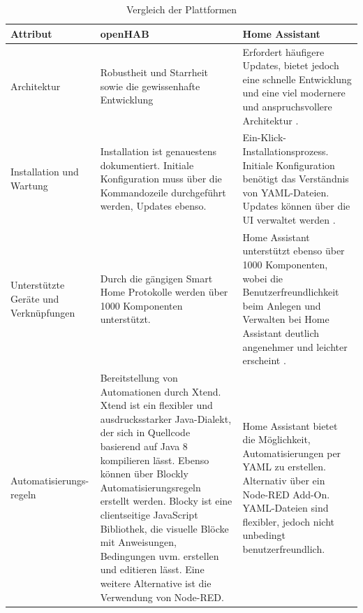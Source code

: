 \documentclass[
  ngerman           %
  ,twoside          %
  ,11pt
  ,pdftex
]{report}
\begin{document}
\chapter{}
\label{appendix:comparison}
\begin{table}[hbt!]
  \begin{center}
      \begin{tabular}{| p{3.0cm} | p{6.2cm} | p{6.2cm} | }
          \hline
            \textbf{Attribut} & \textbf{openHAB} & \textbf{Home Assistant} \\
          \hline
            Architektur & Robustheit und Starrheit sowie die gewissenhafte Entwicklung & Erfordert häufigere Updates, bietet jedoch eine schnelle Entwicklung und eine viel modernere und anspruchsvollere Architektur \cite{sh-uni-comparison}. \\ 
          \hline
            Installation und Wartung & Installation ist genauestens dokumentiert. Initiale Konfiguration muss über die Kommandozeile durchgeführt werden, Updates ebenso. & Ein-Klick-Installationsprozess. Initiale Konfiguration benötigt das Verständnis von YAML-Dateien. Updates können über die UI verwaltet werden \cite{sh-uni-comparison}. \\ 
          \hline
            Unterstützte Geräte und Verknüpfungen & Durch die gängigen Smart Home Protokolle werden über 1000 Komponenten unterstützt. & Home Assistant unterstützt ebenso über 1000 Komponenten, wobei die Benutzerfreundlichkeit beim Anlegen und Verwalten bei Home Assistant deutlich angenehmer und leichter erscheint \cite{msuttner-comparison}. \\ 
          \hline
            Automatisierungs-regeln & Bereitstellung von Automationen durch Xtend. Xtend ist ein flexibler und ausdrucksstarker Java-Dialekt, der sich in Quellcode basierend auf Java 8 kompilieren lässt. Ebenso können über Blockly Automatisierungsregeln erstellt werden. Blocky ist eine clientseitige JavaScript Bibliothek, die visuelle Blöcke mit Anweisungen, Bedingungen uvm. erstellen und editieren lässt. Eine weitere Alternative ist die Verwendung von Node-RED.  & Home Assistant bietet die Möglichkeit, Automatisierungen per YAML zu erstellen. Alternativ über ein Node-RED Add-On. YAML-Dateien sind flexibler, jedoch nicht unbedingt benutzerfreundlich. \\ 
          \hline
      \end{tabular}
  \end{center}
  \caption{Vergleich der Plattformen \cite{sh-uni-comparison} \cite{msuttner-comparison} \cite{barclay-comparison}}
  \label{tab:comparisonTableHAOS-openHAB-part1}
\end{table}
\end{document}

